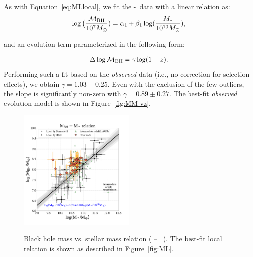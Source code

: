 \documentclass[apj]{emulateapj}
\begin{document}
As with Equation~\ref{eq:MLlocal}, we fit the \mbh-\smass\ data with a linear relation as:
\begin{eqnarray}
\label{eq:MMlocal}
\log \big( \frac{\mathcal M_{\rm BH}}{10^{7}M_{\odot}})= \alpha_1 + \beta_1 \log(\frac{M_*}{10^{10}M_{\odot}}),
\end {eqnarray}

\noindent and an evolution term parameterized in the following form:

\begin{eqnarray}
\label{eq:offset}
\Delta \log \mathcal M_{\rm BH}= \gamma \log (1 + z).
\end{eqnarray} 
Performing such a fit based on the {\it observed} data (i.e., no correction for selection effects), we obtain $\gamma  = 1.03 \pm 0.25$. Even with the exclusion of the few outliers, the slope is significantly non-zero with $\gamma  = 0.89 \pm 0.27$. The best-fit {\it observed} evolution model is shown in Figure~\ref{fig:MM-vz}.

\begin{figure}
\centering
{
\includegraphics[width=0.5\textwidth]{fig/MBH-Mstar.pdf}
}
\caption{\label{fig:MM} 
Black hole mass vs. stellar mass relation ( \mbh -- \smass\ ). The best-fit local relation is shown as described in Figure~\ref{fig:ML}.
}
\end{figure} 
\end{document}
